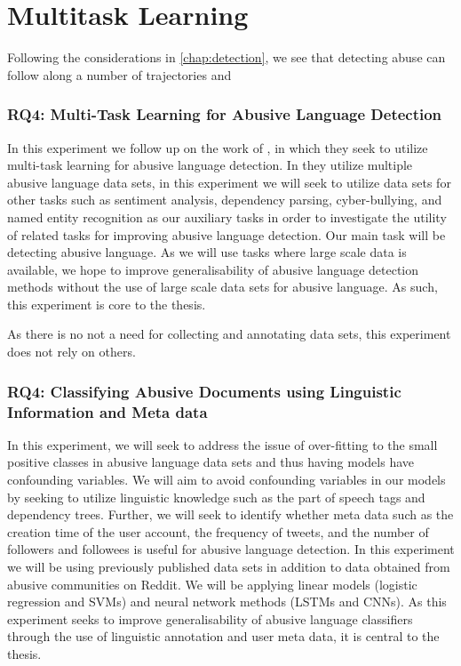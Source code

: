 \ifpdf
    \graphicspath{{Chapter5/Figs/Raster/}{Chapter5/Figs/PDF/}{Chapter5/Figs/}}
\else
    \graphicspath{{Chapter5/Figs/Vector/}{Chapter5/Figs/}}
\fi

\chapter{Multitask Learning}\label{chap:mtl}

Following the considerations in \ref{chap:detection}, we see that detecting abuse can follow along a number of trajectories and 
\subsection{RQ4: Multi-Task Learning for Abusive Language Detection}\label{sub:mtl}
In this experiment we follow up on the work of \cite{Waseem:2018}, in which they seek to utilize multi-task learning for abusive language detection. In \cite{Waseem:2018} they utilize multiple abusive language data sets, in this experiment we will seek to utilize data sets for other tasks such as sentiment analysis, dependency parsing, cyber-bullying, and named entity recognition as our auxiliary tasks in order to investigate the utility of related tasks for improving abusive language detection. Our main task will be detecting abusive language. As we will use tasks where large scale data is available, we hope to improve generalisability of abusive language detection methods without the use of large scale data sets for abusive language. As such, this experiment is core to the thesis.

As there is no not a need for collecting and annotating data sets, this experiment does not rely on others.

\subsection{RQ4: Classifying Abusive Documents using Linguistic Information and Meta data}\label{sub:structuredpred}
In this experiment, we will seek to address the issue of over-fitting to the small positive classes in abusive language data sets and thus having models have confounding variables. We will aim to avoid confounding variables in our models by seeking to utilize linguistic knowledge such as the part of speech tags and dependency trees. Further, we will seek to identify whether meta data such as the creation time of the user account, the frequency of tweets, and the number of followers and followees is useful for abusive language detection. In this experiment we will be using previously published data sets \citep{Waseem:2016,Waseem-Hovy:2016,Davidson:2017} in addition to data obtained from abusive communities on Reddit. We will be applying linear models (logistic regression and SVMs) and neural network methods (LSTMs and CNNs). As this experiment seeks to improve generalisability of abusive language classifiers through the use of linguistic annotation and user meta data, it is central to the thesis.

